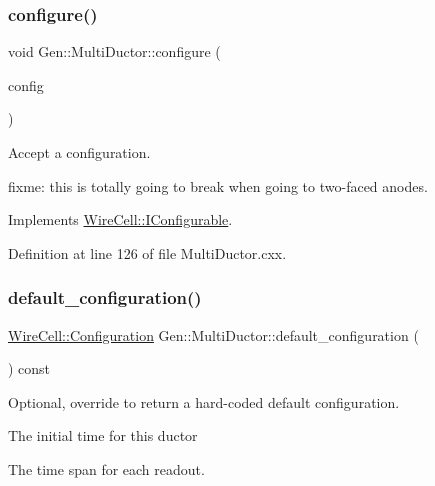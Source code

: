 \subsubsection{\texorpdfstring{configure()}{configure()}}
{\footnotesize\ttfamily void Gen\+::\+Multi\+Ductor\+::configure (\begin{DoxyParamCaption}\item[{const \hyperlink{namespace_wire_cell_a9f705541fc1d46c608b3d32c182333ee}{Wire\+Cell\+::\+Configuration} \&}]{config }\end{DoxyParamCaption})\hspace{0.3cm}{\ttfamily [virtual]}}



Accept a configuration. 

fixme\+: this is totally going to break when going to two-\/faced anodes. 

Implements \hyperlink{class_wire_cell_1_1_i_configurable_a57ff687923a724093df3de59c6ff237d}{Wire\+Cell\+::\+I\+Configurable}.



Definition at line 126 of file Multi\+Ductor.\+cxx.

\mbox{\label{class_wire_cell_1_1_gen_1_1_multi_ductor_a53f3aad2f0b57657421638cb695f8c36}} 
\subsubsection{\texorpdfstring{default\+\_\+configuration()}{default\_configuration()}}
{\footnotesize\ttfamily \hyperlink{namespace_wire_cell_a9f705541fc1d46c608b3d32c182333ee}{Wire\+Cell\+::\+Configuration} Gen\+::\+Multi\+Ductor\+::default\+\_\+configuration (\begin{DoxyParamCaption}{ }\end{DoxyParamCaption}) const\hspace{0.3cm}{\ttfamily [virtual]}}



Optional, override to return a hard-\/coded default configuration. 

The initial time for this ductor

The time span for each readout.

